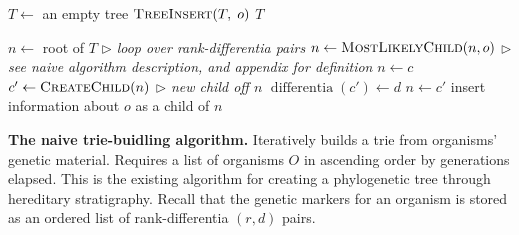 \begin{algorithm}[h]
    \begin{algorithmic}[1]
    \small{
            \State $T \gets$ an empty tree
                \State $\textsc{TreeInsert}(T,\; o)$
            \EndFor
            \State \Return $T$
        \EndFunction

            \State $n \gets$ root of $T$
             \text{ } $\triangleright$ \textit{loop over rank-differentia pairs}
                \State $n \gets \textsc{MostLikelyChild}(n, o)$ \text{ } $\triangleright$ \textit{see naive algorithm description, and appendix for definition}
                    \State $n \gets c$
                \Else 
                    \State $c' \gets \textsc{CreateChild}(n)$ \text{ } $\triangleright$ \textit{new child off $n$} 
                    \State $\operatorname{differentia}(c') \gets d$
                    \State $n \gets c'$
                \EndIf
            \EndFor
            \State insert information about $o$ as a child of $n$
        \EndFunction
    }
    \end{algorithmic}
    \caption{\textbf{The naive trie-buidling algorithm.} \small Iteratively builds a trie from organisms' genetic material. Requires a list of organisms $O$ in ascending order by generations elapsed. This is the existing algorithm for creating a phylogenetic tree through hereditary stratigraphy. Recall that the genetic markers for an organism is stored as an ordered list of rank-differentia $(r, d)$ pairs. \vspace{-1.5em}}
    \label{alg:old}
\end{algorithm}
